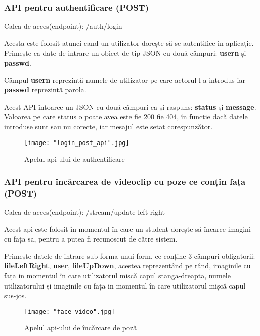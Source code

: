 \documentclass[a4paper, 12pt]{article}
\begin{document}
	\subsubsection{API pentru authentificare (POST)} 
	
	\bigskip
	\quad\space\space Calea de acces(endpoint): /auth/login 
	
	Acesta este folosit atunci cand un utilizator dorește să se autentifice in aplicație. Primește ca date de intrare un obiect de tip JSON\textbf{\cite{bray2017javascript}} cu două câmpuri: \textbf{usern} și \textbf{passwd}. 
	
	Câmpul \textbf{usern} reprezintă numele de utilizator pe care actorul l-a introdus iar \textbf{passwd} reprezintă parola.
	
	Acest API întoarce un JSON cu două câmpuri ca și raspuns: \textbf{status} și \textbf{message}. Valoarea pe care status o poate avea este fie 200 fie 404, în funcție dacă datele introduse sunt sau nu corecte, iar mesajul este setat corespunzător.
	\begin{figure}[!htb]
		\centering
		\texttt{[image: "login\_post\_api".jpg]}
		\caption{Apelul api-ului de authentificare}\label{fig:login}
	\end{figure}
	\bigskip
	\subsubsection{API pentru încărcarea de videoclip cu poze ce conțin fața (POST)} 
	
	\bigskip
	\quad\space\space Calea de acces(endpoint): /stream/update-left-right 
	
	Acest api este folosit în momentul în care un student dorește să încarce imagini cu fața sa, pentru a putea fi recunoscut de către sistem.
	
	Primește datele de intrare sub forma unui form, ce conține 3 câmpuri obligatorii: \textbf{fileLeftRight}, \textbf{user}, \textbf{fileUpDown}, acestea reprezentând pe rând, imaginile cu fața in momentul în care utilizatorul mișcă capul stanga-dreapta, numele utilizatorului și imaginile cu fața in momentul în care utilizatorul mișcă capul sus-jos.
	\begin{figure}[!htb]
		\centering
		\texttt{[image: "face\_video".jpg]}
		\caption{Apelul api-ului de încărcare de poză}\label{fig:face_video}
	\end{figure}
	\bigskip
	
\end{document}
